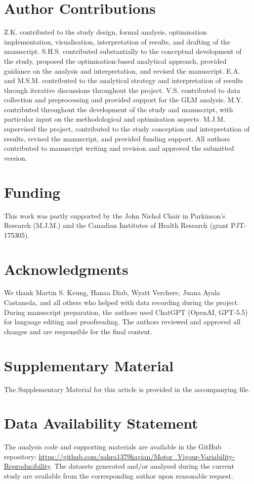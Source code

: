 \documentclass[utf8]{FrontiersinHarvard}
\begin{document}
\section*{Author Contributions}
Z.K. contributed to the study design, formal analysis, optimisation implementation, visualisation, interpretation of results, and drafting of the manuscript. S.H.S. contributed substantially to the conceptual development of the study, proposed the optimisation-based analytical approach, provided guidance on the analysis and interpretation, and revised the manuscript. E.A. and M.S.M. contributed to the analytical strategy and interpretation of results through iterative discussions throughout the project. V.S. contributed to data collection and preprocessing and provided support for the GLM analysis. M.Y. contributed throughout the development of the study and manuscript, with particular input on the methodological and optimisation aspects. M.J.M. supervised the project, contributed to the study conception and interpretation of results, revised the manuscript, and provided funding support. All authors contributed to manuscript writing and revision and approved the submitted version.

\section*{Funding}
This work was partly supported by the John Nichol Chair in Parkinson’s Research (M.J.M.) and the Canadian Institutes of Health Research (grant PJT-175305).

\section*{Acknowledgments}
We thank Martin S. Keung, Hanaa Diab, Wyatt Verchere, Juana Ayala Castaneda, and all others who helped with data recording during the project. During manuscript preparation, the authors used ChatGPT (OpenAI, GPT-5.5) for language editing and proofreading. The authors reviewed and approved all changes and are responsible for the final content.

\section*{Supplementary Material}
The Supplementary Material for this article is provided in the accompanying file.

\section*{Data Availability Statement}
The analysis code and supporting materials are available in the GitHub repository:
\url{https://github.com/zahra1379kavian/Motor_Vigour-Variability-Reproducibility}.
The datasets generated and/or analysed during the current study are available from the corresponding author upon reasonable request.
\end{document}
